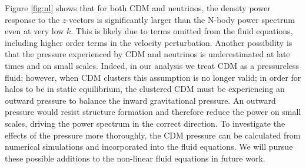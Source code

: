 \documentclass[twocolumn,superscriptaddress,prd]{revtex4}
\begin{document}
Figure \ref{fig:nl} shows that for both CDM and 
neutrinos, the density power response to the $z$-vectors is
significantly larger than the N-body power spectrum even at very low
$k$.  This is likely due to terms omitted from the fluid equations,
including higher order terms in the velocity perturbation.
Another possibility is that the pressure experienced by CDM
and neutrinos is underestimated at late times and on small
scales.  Indeed, in our analysis we treat CDM as a
pressureless fluid; however, when CDM clusters this
assumption is no longer valid; in order for halos to be in static
equilibrium, the clustered CDM must be experiencing an outward
pressure to balance the inward gravitational pressure.  An outward
pressure would resist structure formation and therefore reduce the
power on small scales, driving the power spectrum in the correct direction.
To investigate the effects of the pressure more
thoroughly, the CDM pressure can be
calculated from numerical simulations and incorporated into the fluid equations.
We will pursue these possible additions to the non-linear fluid equations in future work.


\end{document}

